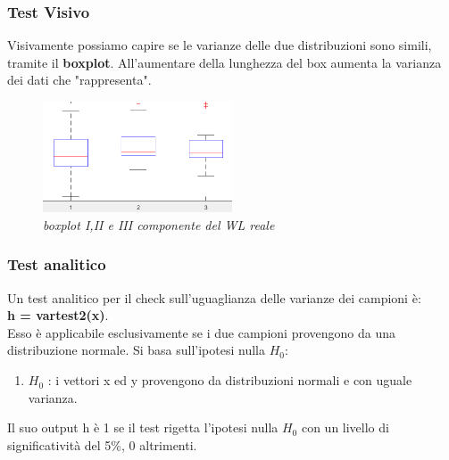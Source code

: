 \subsubsection{Test Visivo}
Visivamente possiamo capire se le varianze delle due distribuzioni sono simili, tramite il \textbf{boxplot}. All'aumentare della lunghezza del box aumenta la varianza dei dati che "rappresenta".
\begin{figure}[H]
	\centering
	\includegraphics[width=0.5\textwidth]{img/hw3/boxplot.png}
	\caption{\textit{boxplot I,II e III componente del WL reale}}
\end{figure}
\subsubsection{Test analitico}
Un test analitico per il check sull'uguaglianza delle varianze dei campioni è: 
\\
\textbf{h = vartest2(x)}.
\\
Esso è applicabile esclusivamente se i due campioni provengono da una distribuzione normale.
Si basa sull'ipotesi nulla $H_0$:
\begin{enumerate}
	\item $H_0$ : i vettori x ed y provengono da distribuzioni normali e con uguale varianza. 
\end{enumerate}
Il suo output h è 1 se il test rigetta l'ipotesi nulla $H_0$ con un livello di significatività del 5\%, 0 altrimenti.

